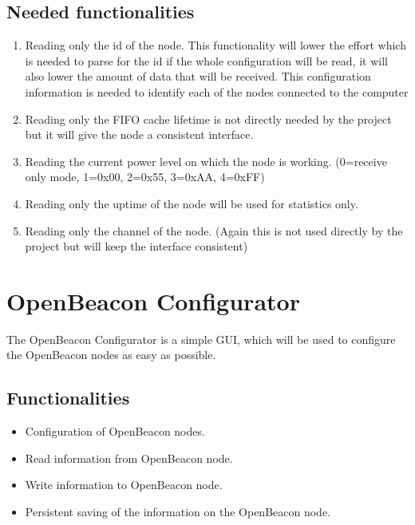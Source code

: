    \subsection{Needed functionalities}
    \begin{enumerate}
     \item Reading only the id of the node. This functionality will lower the effort which is needed to parse for the id if the whole configuration will be read, it will also lower the amount of data that will be received. This configuration information is needed to identify each of the nodes connected to the computer
     \item Reading only the FIFO cache lifetime is not directly needed by the project but it will give the node a consistent interface.
     \item Reading the current power level on which the node is working. (0=receive only mode, 1=0x00, 2=0x55, 3=0xAA, 4=0xFF)
     \item Reading only the uptime of the node will be used for statistics only.
     \item Reading only the channel of the node. (Again this is not used directly by the project but will keep the interface consistent)
    \end{enumerate}

  \section{OpenBeacon Configurator}
  \label{sec:design:OBConfig}
   The OpenBeacon Configurator is a simple GUI, which will be used to configure the OpenBeacon nodes as easy as possible.

   \subsection{Functionalities}
    \begin{itemize}
     \item Configuration of OpenBeacon nodes.
     \item Read information from OpenBeacon node.
     \item Write information to OpenBeacon node.
     \item Persistent saving of the information on the OpenBeacon node.
    \end{itemize}

